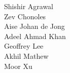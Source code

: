 Shishir Agrawal\\
Zev Chonoles\\
Aise Johan de Jong\\
Adeel Ahmad Khan\\
Geoffrey Lee\\
Akhil Mathew\\
Moor Xu\\

